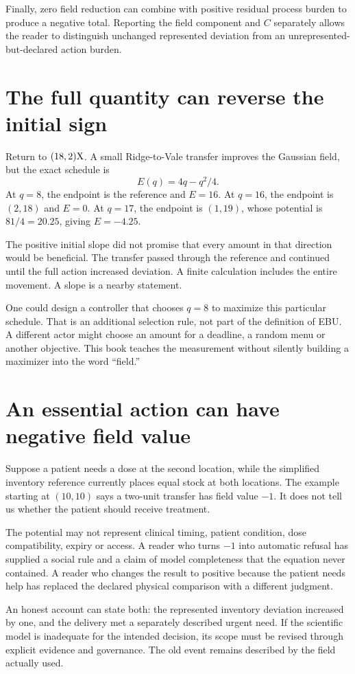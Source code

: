 Finally, zero field reduction can combine with positive residual process burden to produce a negative total. Reporting the field component and $C$ separately allows the reader to distinguish unchanged represented deviation from an unrepresented-but-declared action burden.

\section{The full quantity can reverse the initial sign}
Return to $(18,2)\mathrm{X}$. A small Ridge-to-Vale transfer improves the Gaussian field, but the exact schedule is
\[
 E(q)=4q-q^2/4.
\]
At $q=8$, the endpoint is the reference and $E=16$. At $q=16$, the endpoint is $(2,18)$ and $E=0$. At $q=17$, the endpoint is $(1,19)$, whose potential is $81/4=20.25$, giving $E=-4.25$.

The positive initial slope did not promise that every amount in that direction would be beneficial. The transfer passed through the reference and continued until the full action increased deviation. A finite calculation includes the entire movement. A slope is a nearby statement.

One could design a controller that chooses $q=8$ to maximize this particular schedule. That is an additional selection rule, not part of the definition of EBU. A different actor might choose an amount for a deadline, a random menu or another objective. This book teaches the measurement without silently building a maximizer into the word ``field.''

\section{An essential action can have negative field value}
Suppose a patient needs a dose at the second location, while the simplified inventory reference currently places equal stock at both locations. The example starting at $(10,10)$ says a two-unit transfer has field value $-1$. It does not tell us whether the patient should receive treatment.

The potential may not represent clinical timing, patient condition, dose compatibility, expiry or access. A reader who turns $-1$ into automatic refusal has supplied a social rule and a claim of model completeness that the equation never contained. A reader who changes the result to positive because the patient needs help has replaced the declared physical comparison with a different judgment.

An honest account can state both: the represented inventory deviation increased by one, and the delivery met a separately described urgent need. If the scientific model is inadequate for the intended decision, its scope must be revised through explicit evidence and governance. The old event remains described by the field actually used.

